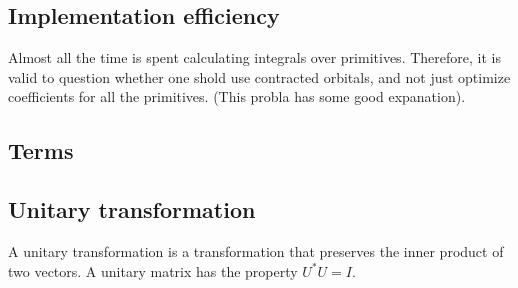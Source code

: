 \documentclass[a4paper,10pt, twocolumn, pre]{revtex4}
\begin{document}
\subsection{Implementation efficiency}
Almost all the time is spent calculating integrals over primitives. Therefore, it is valid to question whether one shold use contracted orbitals, and not just optimize coefficients for all the primitives. (This probla has some good expanation).



\begin{appendices}
\section{Terms}
\subsection{Unitary transformation}
A unitary transformation is a transformation that preserves the inner product of two vectors. A unitary matrix has the property $U^*U = I$. 

\end{appendices}



\end{document}

